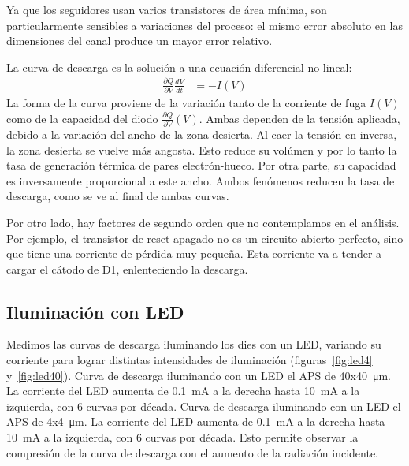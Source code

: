 Ya que los seguidores usan varios transistores de área mínima,
son particularmente sensibles a variaciones del proceso:
el mismo error absoluto en las dimensiones del canal produce un mayor error relativo.


La curva de descarga es la solución a una ecuación diferencial
no-lineal:
\begin{align*}
    \frac{\partial Q}{\partial V}\frac{dV}{dt} &= -I(V)
\end{align*}
La forma de la curva proviene de la variación 
tanto de la corriente de fuga $I(V)$ 
como de la capacidad del diodo $\frac{\partial Q}{\partial V}(V)$.
Ambas dependen de la tensión aplicada,
debido a la variación del ancho de la zona desierta.
Al caer la tensión en inversa,
la zona desierta se vuelve más angosta.
Esto reduce su volúmen y por lo tanto 
la tasa de generación térmica de pares electrón-hueco.
Por otra parte,
su capacidad es inversamente proporcional a este ancho.
Ambos fenómenos reducen la tasa de descarga,
como se ve al final de ambas curvas.

Por otro lado, hay factores de segundo orden 
que no contemplamos en el análisis.
Por ejemplo, el transistor de reset apagado
no es un circuito abierto perfecto, 
sino que tiene una corriente de pérdida muy pequeña.
Esta corriente va a tender a cargar el cátodo de D1,
enlenteciendo la descarga.
%
\subsection{Iluminación con LED}
Medimos las curvas de descarga iluminando los dies con un LED,
variando su corriente para lograr distintas intensidades de iluminación
(figuras~\ref{fig:led4} y~\ref{fig:led40}).
{Curva de descarga iluminando con un LED el APS de 40x\SI{40}{\micro\meter}.
La corriente del LED aumenta de \SI{.1}{\milli\ampere} a la derecha hasta
\SI{10}{\milli\ampere} a la izquierda,
con 6 curvas por década.}
{Curva de descarga iluminando con un LED el APS de 4x\SI{4}{\micro\meter}.
La corriente del LED aumenta de \SI{.1}{\milli\ampere} a la derecha hasta
\SI{10}{\milli\ampere} a la izquierda,
con 6 curvas por década.}
Esto permite observar la compresión de la curva de descarga 
con el aumento de la radiación incidente.
